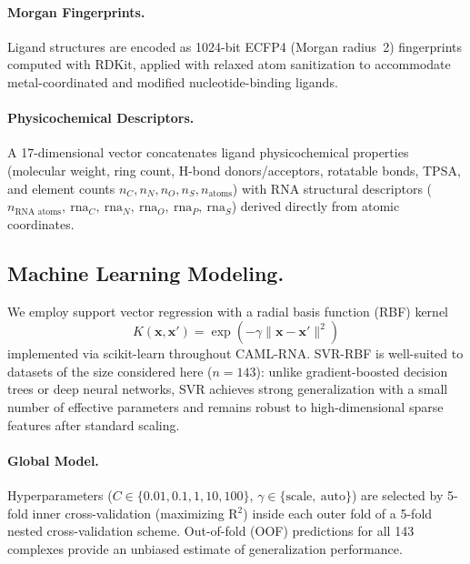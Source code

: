 \documentclass[10pt,twocolumn]{article}
\begin{document}
\paragraph{Morgan Fingerprints.}
Ligand structures are encoded as 1024-bit ECFP4 (Morgan radius~2) fingerprints\cite{Rogers2010}
computed with RDKit, applied with relaxed atom sanitization to accommodate
metal-coordinated and modified nucleotide-binding ligands.

\paragraph{Physicochemical Descriptors.}
A 17-dimensional vector concatenates ligand physicochemical properties
(molecular weight, ring count, H-bond donors/acceptors, rotatable bonds, TPSA,
and element counts $n_C, n_N, n_O, n_S, n_{\text{atoms}}$)
with RNA structural descriptors ($n_{\text{RNA atoms}},\
\mathrm{rna}_C,\ \mathrm{rna}_N,\ \mathrm{rna}_O,\ \mathrm{rna}_P,\ \mathrm{rna}_S$)
derived directly from atomic coordinates.


\subsection{Machine Learning Modeling.}

We employ support vector regression\cite{Cortes1995} with a radial basis function (RBF) kernel
\begin{equation*}
K(\mathbf{x}, \mathbf{x}') = \exp\!\left(-\gamma \|\mathbf{x} - \mathbf{x}'\|^2\right)
\end{equation*}
implemented via scikit-learn\cite{Pedregosa2011} throughout CAML-RNA.
SVR-RBF is well-suited to datasets of the size considered here ($n = 143$):
unlike gradient-boosted decision trees or deep neural networks, SVR achieves
strong generalization with a small number of effective parameters and
remains robust to high-dimensional sparse features after standard scaling.

\paragraph{Global Model.}
Hyperparameters ($C \in \{0.01, 0.1, 1, 10, 100\}$, $\gamma \in \{\text{scale},\ \text{auto}\}$)
are selected by 5-fold inner cross-validation (maximizing R$^2$) inside each
outer fold of a 5-fold nested cross-validation scheme.
Out-of-fold (OOF) predictions for all 143 complexes provide an unbiased estimate
of generalization performance.
\end{document}
